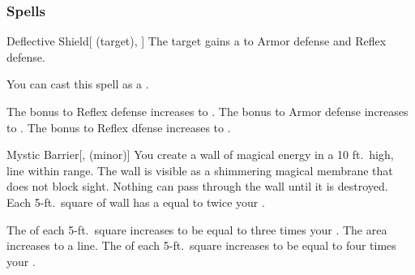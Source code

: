 \subsubsection{Spells}


\lowercase{\hypertarget{spell:Deflective Shield}{}}\label{spell:Deflective Shield}
\begin{attuneability}[Rank 1]{\hypertarget{spell:Deflective Shield}{Deflective Shield}}[ (target), ]
The target gains a   to Armor defense and Reflex defense.

You can cast this spell as a .

\rankline
{} The bonus to Reflex defense increases to .
 The bonus to Armor defense increases to .
 The bonus to Reflex dfense increases to .
\end{attuneability}
\vspace{0.25em}



\lowercase{\hypertarget{spell:Mystic Barrier}{}}\label{spell:Mystic Barrier}
\begin{freeability}[Rank 1]{\hypertarget{spell:Mystic Barrier}{Mystic Barrier}}[,  (minor)]
\targetrule
You create a wall of magical energy in a 10 ft.\ high, \areamed line within \rngmed range.
The wall is visible as a shimmering magical membrane that does not block sight.
Nothing can pass through the wall until it is destroyed.
Each 5-ft.\ square of wall has a  equal to twice your .

\rankline
{} The  of each 5-ft.\ square increases to be equal to three times your .
 The area increases to a \arealarge line.
 The  of each 5-ft.\ square increases to be equal to four times your .
\end{freeability}
\vspace{0.25em}



